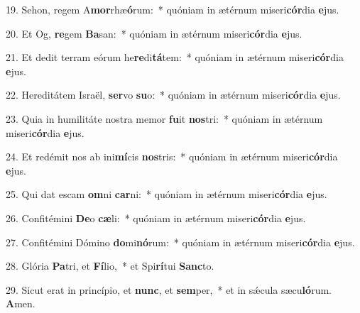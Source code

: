 19. Sehon, regem A\textbf{mor}rhæ\textbf{ó}rum:~*  quóniam in ætérnum miseri\textbf{cór}dia \textbf{e}jus.\

20. Et Og, \textbf{re}gem \textbf{Ba}san:~*  quóniam in ætérnum miseri\textbf{cór}dia \textbf{e}jus.\

21. Et dedit terram eórum he\textbf{re}di\textbf{tá}tem:~*  quóniam in ætérnum miseri\textbf{cór}dia \textbf{e}jus.\

22. Hereditátem Israël, \textbf{ser}vo \textbf{su}o:~*  quóniam in ætérnum miseri\textbf{cór}dia \textbf{e}jus.\

23. Quia in humilitáte nostra memor \textbf{fu}it \textbf{nos}tri:~*  quóniam in ætérnum miseri\textbf{cór}dia \textbf{e}jus.\

24. Et redémit nos ab ini\textbf{mí}cis \textbf{nos}tris:~*  quóniam in ætérnum miseri\textbf{cór}dia \textbf{e}jus.\

25. Qui dat escam \textbf{om}ni \textbf{car}ni:~*  quóniam in ætérnum miseri\textbf{cór}dia \textbf{e}jus.\

26. Confitémini \textbf{De}o \textbf{cæ}li:~*  quóniam in ætérnum miseri\textbf{cór}dia \textbf{e}jus.\

27. Confitémini Dómino \textbf{do}mi\textbf{nó}rum:~*  quóniam in ætérnum miseri\textbf{cór}dia \textbf{e}jus.\

28. Glória \textbf{Pa}tri, et \textbf{Fí}lio,~*  et Spi\textbf{rí}tui \textbf{Sanc}to.\

29. Sicut erat in princípio, et \textbf{nunc}, et \textbf{sem}per,~*  et in sǽcula sæcu\textbf{ló}rum. \textbf{A}men.\

